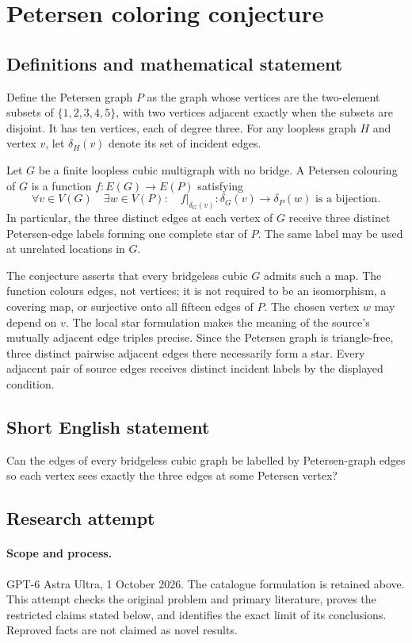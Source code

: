 \documentclass[11pt,a4paper]{article}
\begin{document}
\section*{Petersen coloring conjecture}\label{statement}

\subsection{Definitions and mathematical statement}
Define the Petersen graph $P$ as the graph whose
vertices are the two-element subsets of
$\{1,2,3,4,5\}$, with two vertices adjacent
exactly when the subsets are disjoint. It has
ten vertices, each of degree three. For any
loopless graph $H$ and vertex $v$, let
$\delta_H(v)$ denote its set of incident edges.

Let $G$ be a finite loopless cubic multigraph
with no bridge. A Petersen colouring of $G$
is a function $f:E(G)\to E(P)$ satisfying
\[
 \forall v\in V(G)\quad\exists w\in V(P):
 \quad f\big|_{\delta_G(v)}:
 \delta_G(v)\longrightarrow\delta_P(w)
 \text{ is a bijection}.
\]
In particular, the three distinct edges at
each vertex of $G$ receive three distinct
Petersen-edge labels forming one complete
star of $P$. The same label may be used at
unrelated locations in $G$.

The conjecture asserts that every bridgeless
cubic $G$ admits such a map. The function
colours edges, not vertices; it is not required
to be an isomorphism, a covering map, or
surjective onto all fifteen edges of $P$.
The chosen vertex $w$ may depend on $v$.
The local star formulation makes the meaning
of the source's mutually adjacent edge triples
precise. Since the Petersen graph is triangle-free,
three distinct pairwise adjacent edges there
necessarily form a star. Every adjacent pair
of source edges receives distinct incident
labels by the displayed condition.
\subsection{Short English statement}
Can the edges of every bridgeless cubic graph be labelled by Petersen-graph edges so each vertex sees exactly the three edges at some Petersen vertex?
\subsection{Research attempt}
\paragraph{Scope and process.}
GPT-6 Astra Ultra, 1 October 2026. The catalogue formulation is retained above. This attempt checks the original problem and primary literature, proves the restricted claims stated below, and identifies the exact limit of its conclusions. Reproved facts are not claimed as novel results.
\end{document}
